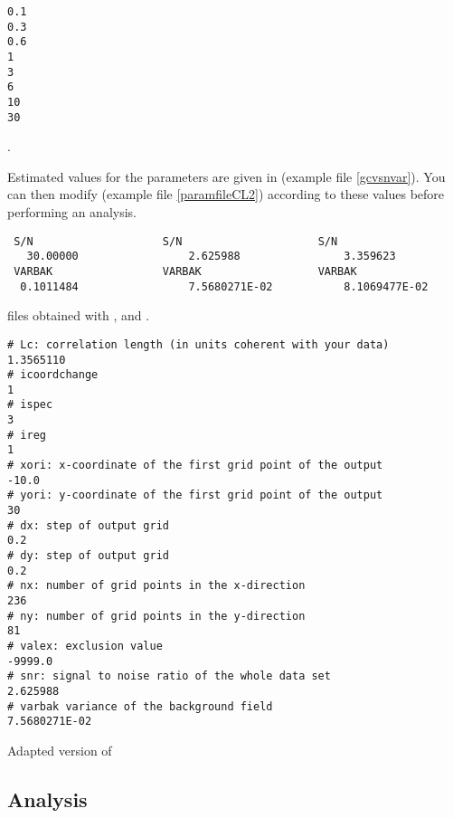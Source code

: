 \begin{exfile}[H]
\begin{footnotesize}
\begin{verbatim}
0.1
0.3
0.6
1
3
6
10
30
\end{verbatim}
\end{footnotesize}
\caption{. \label{gcvsampling}}
\end{exfile}


Estimated values for the parameters are given in  (example file \ref{gcvsnvar}). You can then modify  (example file \ref{paramfileCL2}) according to these values before performing an analysis. 

\begin{exfile}[H]
\begin{footnotesize}
\begin{verbatim}
 S/N					S/N						S/N
   30.00000    				2.625988 				3.359623  
 VARBAK					VARBAK					VARBAK
  0.1011484  				7.5680271E-02			8.1069477E-02
\end{verbatim}
\end{footnotesize}
\caption{ files obtained with ,  and .\label{gcvsnvar}}
\end{exfile}


\begin{exfile}[htpb]
\begin{footnotesize}
\begin{verbatim}
# Lc: correlation length (in units coherent with your data)
1.3565110
# icoordchange 
1
# ispec 
3
# ireg 
1
# xori: x-coordinate of the first grid point of the output
-10.0
# yori: y-coordinate of the first grid point of the output
30
# dx: step of output grid
0.2
# dy: step of output grid
0.2
# nx: number of grid points in the x-direction
236
# ny: number of grid points in the y-direction
81
# valex: exclusion value
-9999.0
# snr: signal to noise ratio of the whole data set
2.625988 
# varbak variance of the background field
7.5680271E-02
\end{verbatim}
\end{footnotesize}
\caption{Adapted version of \label{paramfileCL2}}
\end{exfile}

\subsection{Analysis}

